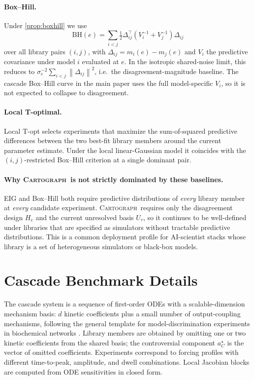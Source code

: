 \documentclass{article}
\newcommand{\method}{\textsc{Cartograph}}
\newcommand{\norm}[1]{\left\lVert #1 \right\rVert}
\theoremstyle{plain}
\theoremstyle{definition}
\theoremstyle{remark}
\begin{document}
\paragraph{Box--Hill.}
Under \cref{prop:boxhill} we use
\begin{equation}
\mathrm{BH}(e) = \sum_{i<j}\tfrac{1}{2}\Delta_{ij}^\top(V_i^{-1}+V_j^{-1})\Delta_{ij}
\end{equation}
over all library pairs $(i,j)$, with $\Delta_{ij}=m_i(e)-m_j(e)$ and
$V_i$ the predictive covariance under model $i$ evaluated at $e$. In the
isotropic shared-noise limit, this reduces to
$\sigma_e^{-2}\sum_{i<j}\norm{\Delta_{ij}}^2$, i.e.~the disagreement-magnitude
baseline. The cascade Box--Hill curve in the main paper uses the full
model-specific $V_i$, so it is not expected to collapse to disagreement.

\paragraph{Local T-optimal.}
Local T-opt \citep{atkinsonfedorov1975,pukelsheim2006optimal} selects
experiments that maximize the sum-of-squared predictive differences
between the two best-fit library members around the current parameter
estimate. Under the local linear-Gaussian model it coincides with the
$(i,j)$-restricted Box--Hill criterion at a single dominant pair.

\paragraph{Why \method\ is not strictly dominated by these baselines.}
EIG and Box--Hill both require predictive distributions of \emph{every}
library member at \emph{every} candidate experiment. \method\ requires
only the disagreement design $H_e$ and the current unresolved basis
$U_\tau$, so it continues to be well-defined under libraries that are
specified as simulators without tractable predictive distributions. This
is a common deployment profile for AI-scientist stacks whose library is a
set of heterogeneous simulators or black-box models.

\section{Cascade Benchmark Details}
\label{app:cascade}

The cascade system is a sequence of first-order ODEs with a
scalable-dimension mechanism basis: $d$ kinetic coefficients plus a small
number of output-coupling mechanisms, following the general template for
model-discrimination experiments in biochemical networks
\citep{vanhof2014optimal}. Library members are obtained by
omitting one or two kinetic coefficients from the shared basis; the
controversial component $a^{\star}_C$ is the vector of omitted
coefficients. Experiments correspond to forcing profiles with different
time-to-peak, amplitude, and dwell combinations. Local Jacobian blocks are
computed from ODE sensitivities in closed form.
\end{document}
